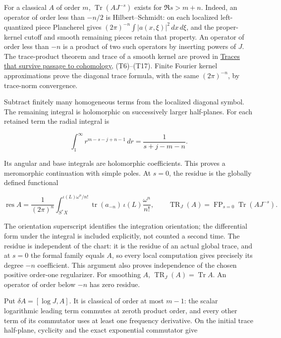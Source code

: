 \documentclass[
  11pt,
]{article}
\begin{document}
For a classical \(A\) of order \(m\), \(\operatorname{Tr}(AJ^{-s})\)
exists for \(\Re s>m+n\). Indeed, an operator of order less than
\(-n/2\) is Hilbert--Schmidt: on each localized left-quantized piece
Plancherel gives \((2\pi)^{-n}\int|a(x,\xi)|^2\,dx\,d\xi\), and the
proper-kernel cutoff and smooth remaining pieces retain that property.
An operator of order less than \(-n\) is a product of two such operators
by inserting powers of \(J\). The trace-product theorem and trace of a
smooth kernel are proved in \href{traces-and-complexes.pdf}{Traces that
survive passage to cohomology}, (T6)--(T17). Finite Fourier kernel
approximations prove the diagonal trace formula, with the same
\((2\pi)^{-n}\), by trace-norm convergence.

Subtract finitely many homogeneous terms from the localized diagonal
symbol. The remaining integral is holomorphic on successively larger
half-planes. For each retained term the radial integral is

\[
 \int_1^\infty r^{m-s-j+n-1}\,dr=
                  \frac1{s+j-m-n}.
\tag{IG7}
\]

Its angular and base integrals are holomorphic coefficients. This proves
a meromorphic continuation with simple poles. At \(s=0\), the residue is
the globally defined functional

\[
 \operatorname{res}A=\frac1{(2\pi)^n}
   \int_{S^*X}^{\iota(L)\omega^n/n!}
        \operatorname{tr}(a_{-n})\,\iota(L)\frac{\omega^n}{n!},
 \qquad
 \operatorname{TR}_J(A)=\operatorname{FP}_{s=0}
                         \operatorname{Tr}(AJ^{-s}).
\tag{IG8}
\]

The orientation superscript identifies the integration orientation; the
differential form under the integral is included explicitly, not counted
a second time. The residue is independent of the chart: it is the
residue of an actual global trace, and at \(s=0\) the formal family
equals \(A\), so every local computation gives precisely its degree
\(-n\) coefficient. This argument also proves independence of the chosen
positive order-one regularizer. For smoothing \(A\),
\(\operatorname{TR}_J(A)=\operatorname{Tr}A\). An operator of order
below \(-n\) has zero residue.

Put \(\delta A=[\log J,A]\). It is classical of order at most \(m-1\):
the scalar logarithmic leading term commutes at zeroth product order,
and every other term of its commutator uses at least one frequency
derivative. On the initial trace half-plane, cyclicity and the exact
exponential commutator give
\end{document}
